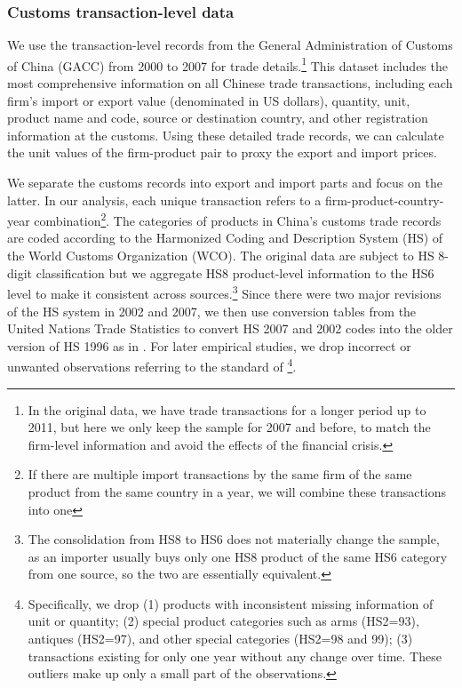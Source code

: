 \subsubsection{Customs transaction-level data} \label{Data-Customs}

We use the transaction-level records from the General Administration of Customs of China (GACC) from 2000 to 2007 for trade details.\footnote{In the original data, we have trade transactions for a longer period up to 2011, but here we only keep the sample for 2007 and before, to match the firm-level information and avoid the effects of the financial crisis.} This dataset includes the most comprehensive information on all Chinese trade transactions, including each firm's import or export value (denominated in US dollars), quantity, unit, product name and code, source or destination country, and other registration information at the customs. Using these detailed trade records, we can calculate the unit values of the firm-product pair to proxy the export and import prices.

We separate the customs records into export and import parts and focus on the latter. In our analysis, each unique transaction refers to a firm-product-country-year combination\footnote{If there are multiple import transactions by the same firm of the same product from the same country in a year, we will combine these transactions into one}. The categories of products in China's customs trade records are coded according to the Harmonized Coding and Description System (HS) of the World Customs Organization (WCO). The original data are subject to HS 8-digit classification but we aggregate HS8 product-level information to the HS6 level to make it consistent across sources.\footnote{The consolidation from HS8 to HS6 does not materially change the sample, as an importer usually buys only one HS8 product of the same HS6 category from one source, so the two are essentially equivalent.} Since there were two major revisions of the HS system in 2002 and 2007, we then use conversion tables from the United Nations Trade Statistics to convert HS 2007 and 2002 codes into the older version of HS 1996 as in \cite{fan-li-yeaple2015}. For later empirical studies, we drop incorrect or unwanted observations referring to the standard of \cite{lmx2015} \footnote{Specifically, we drop (1) products with inconsistent missing information of unit or quantity; (2) special product categories such as arms (HS2=93), antiques (HS2=97), and other special categories (HS2=98 and 99); (3) transactions existing for only one year without any change over time. These outliers make up only a small part of the observations.}.

